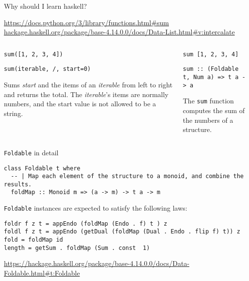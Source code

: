 \documentclass[8pt]{beamer}
\begin{document}
\begin{frame}[fragile]{Why should I learn haskell?}

{\tiny \url{https://docs.python.org/3/library/functions.html#sum}}
{\tiny \url{hackage.haskell.org/package/base-4.14.0.0/docs/Data-List.html#v:intercalate}}

\begin{columns}%
\begin{column}{.48\textwidth}
\begin{verbatim}
sum([1, 2, 3, 4])
\end{verbatim}
\begin{verbatim}
sum(iterable, /, start=0)
\end{verbatim}

Sums \emph{start} and the items of an \emph{iterable} from left to right and
returns the total. The \emph{iterable}’s items are normally numbers, and the start
value is not allowed to be a string.


\end{column}
%
\begin{column}{.48\textwidth}
\begin{verbatim}
sum [1, 2, 3, 4]
\end{verbatim}

\begin{verbatim}
sum :: (Foldable t, Num a) => t a -> a
\end{verbatim}

The \verb|sum| function computes the sum of the numbers of a structure.

\end{column}
\end{columns}
\end{frame}

\begin{frame}[fragile]{\texttt{Foldable} in detail}


\begin{verbatim}
class Foldable t where
  -- | Map each element of the structure to a monoid, and combine the results.
  foldMap :: Monoid m => (a -> m) -> t a -> m
\end{verbatim}

\verb|Foldable| instances are expected to satisfy the following laws:

\begin{verbatim}
foldr f z t = appEndo (foldMap (Endo . f) t ) z
foldl f z t = appEndo (getDual (foldMap (Dual . Endo . flip f) t)) z
fold = foldMap id
length = getSum . foldMap (Sum . const  1)
\end{verbatim}
{\tiny \url{https://hackage.haskell.org/package/base-4.14.0.0/docs/Data-Foldable.html#t:Foldable}}
\end{frame}
\end{document}
